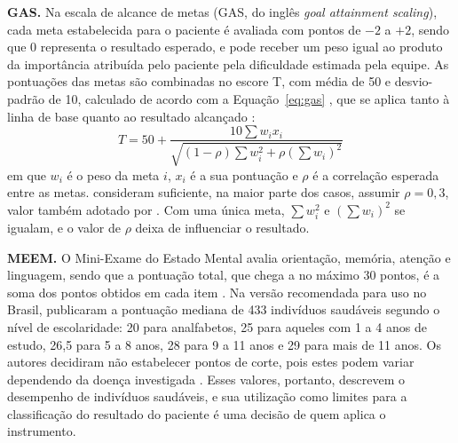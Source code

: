 \textbf{GAS.} Na escala de alcance de metas (GAS, do inglês \textit{goal attainment scaling}), cada meta estabelecida
para o paciente é avaliada com pontos de $-2$ a $+2$, sendo que 0 representa o resultado esperado, e pode receber um
peso igual ao produto da importância atribuída pelo paciente pela dificuldade estimada pela equipe. As pontuações das
metas são combinadas no escore T, com média de 50 e desvio-padrão de 10, calculado de acordo com a
Equação~\ref{eq:gas} \cite[p.~449]{kiresuk1968goal}, que se aplica tanto à linha de base quanto ao resultado
alcançado \cite[p.~364--365]{turnerstokes2009gas}:
\begin{equation}
	\label{eq:gas}
	T = 50 + \frac{10 \sum w_i x_i}{\sqrt{(1 - \rho) \sum w_i^2 + \rho \left( \sum w_i \right)^2}}
\end{equation}
\noindent em que $w_i$ é o peso da meta $i$, $x_i$ é a sua pontuação e $\rho$ é a correlação esperada entre as
metas.  consideram suficiente, na maior parte dos casos, assumir
$\rho = 0{,}3$, valor também adotado por . Com uma única meta,
$\sum w_i^2$ e $\left( \sum w_i \right)^2$ se igualam, e o valor de $\rho$ deixa de influenciar o resultado.

\textbf{MEEM.} O Mini-Exame do Estado Mental avalia orientação, memória, atenção e linguagem, sendo que a pontuação
total, que chega a no máximo 30 pontos, é a soma dos pontos obtidos em cada item \cite[p.~190]{folstein1975minimental}.
Na versão recomendada para uso no Brasil,  publicaram a pontuação mediana de 433
indivíduos saudáveis segundo o nível de escolaridade: 20 para analfabetos, 25 para aqueles com 1 a 4 anos de estudo,
26,5 para 5 a 8 anos, 28 para 9 a 11 anos e 29 para mais de 11 anos. Os autores decidiram não estabelecer pontos de
corte, pois estes podem variar dependendo da doença investigada \cite[p.~780]{brucki2003mem}. Esses valores,
portanto, descrevem o desempenho de indivíduos saudáveis, e sua utilização como limites para a classificação do
resultado do paciente é uma decisão de quem aplica o instrumento.


